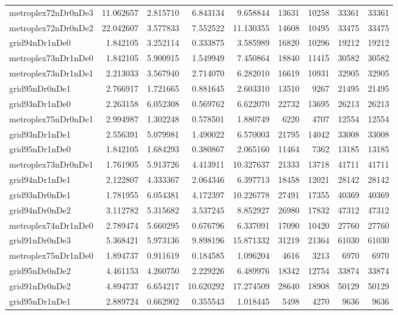 \begin{longtable}{|l|r|r|r|r|r|r|r|r|}
metroplex72nDr0nDe3 & 11.062657 & 2.815710 & 6.843134 & 9.658844 & 13631 & 10258 & 33361 & 33361 \\
metroplex72nDr0nDe2 & 22.042607 & 3.577833 & 7.552522 & 11.130355 & 14608 & 10495 & 33475 & 33475 \\
grid94nDr1nDe0 & 1.842105 & 3.252114 & 0.333875 & 3.585989 & 16820 & 10296 & 19212 & 19212 \\
metroplex73nDr1nDe0 & 1.842105 & 5.900915 & 1.549949 & 7.450864 & 18840 & 11415 & 30582 & 30582 \\
metroplex73nDr1nDe1 & 2.213033 & 3.567940 & 2.714070 & 6.282010 & 16619 & 10931 & 32905 & 32905 \\
grid95nDr0nDe1 & 2.766917 & 1.721665 & 0.881645 & 2.603310 & 13510 & 9267 & 21495 & 21495 \\
grid93nDr1nDe0 & 2.263158 & 6.052308 & 0.569762 & 6.622070 & 22732 & 13695 & 26213 & 26213 \\
metroplex75nDr0nDe1 & 2.994987 & 1.302248 & 0.578501 & 1.880749 & 6220 & 4707 & 12554 & 12554 \\
grid93nDr1nDe1 & 2.556391 & 5.079981 & 1.490022 & 6.570003 & 21795 & 14042 & 33008 & 33008 \\
grid95nDr1nDe0 & 1.842105 & 1.684293 & 0.380867 & 2.065160 & 11464 & 7362 & 13185 & 13185 \\
metroplex73nDr0nDe1 & 1.761905 & 5.913726 & 4.413911 & 10.327637 & 21333 & 13718 & 41711 & 41711 \\
grid94nDr1nDe1 & 2.122807 & 4.333367 & 2.064346 & 6.397713 & 18458 & 12021 & 28142 & 28142 \\
grid93nDr0nDe1 & 1.781955 & 6.054381 & 4.172397 & 10.226778 & 27491 & 17355 & 40369 & 40369 \\
grid94nDr0nDe2 & 3.112782 & 5.315682 & 3.537245 & 8.852927 & 26980 & 17832 & 47312 & 47312 \\
metroplex74nDr1nDe0 & 2.789474 & 5.660295 & 0.676796 & 6.337091 & 17090 & 10420 & 27760 & 27760 \\
grid91nDr0nDe3 & 5.368421 & 5.973136 & 9.898196 & 15.871332 & 31219 & 21364 & 61030 & 61030 \\
metroplex75nDr1nDe0 & 1.894737 & 0.911619 & 0.184585 & 1.096204 & 4616 & 3213 & 6970 & 6970 \\
grid95nDr0nDe2 & 4.461153 & 4.260750 & 2.229226 & 6.489976 & 18342 & 12754 & 33874 & 33874 \\
grid91nDr0nDe2 & 4.894737 & 6.654217 & 10.620292 & 17.274509 & 28640 & 18908 & 50129 & 50129 \\
grid95nDr1nDe1 & 2.889724 & 0.662902 & 0.355543 & 1.018445 & 5498 & 4270 & 9636 & 9636 \\

\end{longtable}

